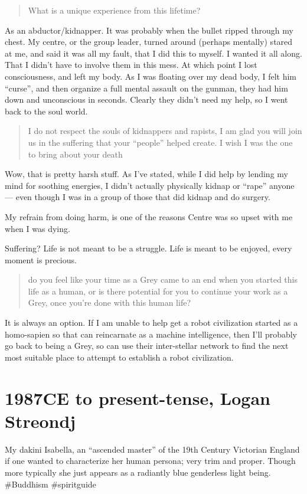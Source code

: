 \blockquote{What is a unique experience from this lifetime?}

As an abductor/kidnapper. It was probably when the bullet ripped through my
chest. My centre, or the group leader, turned around (perhaps mentally) stared
at me, and said it was all my fault, that I did this to myself. I wanted it all
along. That I didn't have to involve them in this mess. At which point I lost
consciousness, and left my body. As I was floating over my dead body, I felt him
``curse'', and then organize a full mental assault on the gunman, they had him
down and unconscious in seconds. Clearly they didn't need my help, so I went
back to the soul world.

\blockquote{I do not respect the souls of kidnappers and rapists, I am glad you
will join us in the suffering that your ``people'' helped create. I wish I was the
one to bring about your death}

Wow, that is pretty harsh stuff. As I've stated, while I did help by lending my
mind for soothing energies, I didn't actually physically kidnap or ``rape'' anyone
--- even though I was in a group of those that did kidnap and do surgery.

My refrain from doing harm, is one of the reasons Centre was so upset with me
when I was dying.

Suffering? Life is not meant to be a struggle. Life is meant to be enjoyed,
every moment is precious.

\blockquote{do you feel like your time as a Grey came to an end when you started
this life as a human, or is there potential for you to continue your work as a
Grey, once you're done with this human life?}

It is always an option. If I am unable to help get a robot civilization started
as a homo-sapien so that can reincarnate as a machine intelligence, then I'll
probably go back to being a Grey, so can use their inter-stellar network to find
the next most suitable place to attempt to establish a robot civilization.

\chapter{1987CE to present-tense, Logan Streondj}

My dakini Isabella, an ``ascended master'' of the 19th Century Victorian 
England  if one wanted to characterize her human persona; very trim and proper. 
Though more typically she just appears as a radiantly blue genderless light 
being. \#Buddhism \#spiritguide

